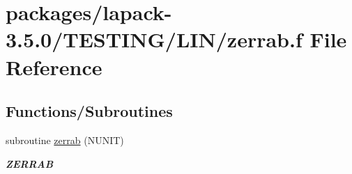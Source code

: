 \hypertarget{zerrab_8f}{}\section{packages/lapack-\/3.5.0/\+T\+E\+S\+T\+I\+N\+G/\+L\+I\+N/zerrab.f File Reference}
\label{zerrab_8f}
\subsection*{Functions/\+Subroutines}
\begin{DoxyCompactItemize}
\item 
subroutine \hyperlink{group__complex16__lin_gaaffa3fdf8b7a7af2291a346dbacaa10f}{zerrab} (N\+U\+N\+I\+T)
\begin{DoxyCompactList}\small\item\em {\bfseries Z\+E\+R\+R\+A\+B} \end{DoxyCompactList}\end{DoxyCompactItemize}
